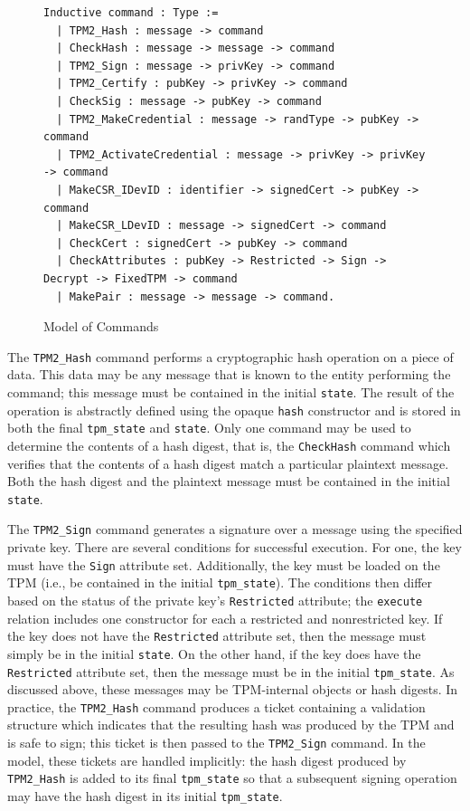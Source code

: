 \documentclass[runningheads]{llncs}
\begin{document}
\begin{figure}[h]
  \begin{lstlisting}[language=Coq]
  Inductive command : Type :=
  | TPM2_Hash : message -> command
  | CheckHash : message -> message -> command
  | TPM2_Sign : message -> privKey -> command
  | TPM2_Certify : pubKey -> privKey -> command
  | CheckSig : message -> pubKey -> command
  | TPM2_MakeCredential : message -> randType -> pubKey -> command
  | TPM2_ActivateCredential : message -> privKey -> privKey -> command
  | MakeCSR_IDevID : identifier -> signedCert -> pubKey -> command
  | MakeCSR_LDevID : message -> signedCert -> command
  | CheckCert : signedCert -> pubKey -> command
  | CheckAttributes : pubKey -> Restricted -> Sign -> Decrypt -> FixedTPM -> command
  | MakePair : message -> message -> command.
  \end{lstlisting}
  \caption{Model of Commands}
  \end{figure}

The \verb|TPM2_Hash| command performs a cryptographic hash operation on a piece of data. This data may be any message that is known to the entity performing the command; this message must be contained in the initial \verb|state|. The result of the operation is abstractly defined using the opaque \verb|hash| constructor and is stored in both the final \verb|tpm_state| and \verb|state|. Only one command may be used to determine the contents of a hash digest, that is, the \verb|CheckHash| command which verifies that the contents of a hash digest match a particular plaintext message. Both the hash digest and the plaintext message must be contained in the initial \verb|state|.

The \verb|TPM2_Sign| command generates a signature over a message using the specified private key. There are several conditions for successful execution. For one, the key must have the \verb|Sign| attribute set. Additionally, the key must be loaded on the TPM (i.e., be contained in the initial \verb|tpm_state|). The conditions then differ based on the status of the private key's \verb|Restricted| attribute; the \verb|execute| relation includes one constructor for each a restricted and nonrestricted key. If the key does not have the \verb|Restricted| attribute set, then the message must simply be in the initial \verb|state|. On the other hand, if the key does have the \verb|Restricted| attribute set, then the message must be in the initial \verb|tpm_state|. As discussed above, these messages may be TPM-internal objects or hash digests. In practice, the \verb|TPM2_Hash| command produces a ticket containing a validation structure which indicates that the resulting hash was produced by the TPM and is safe to sign; this ticket is then passed to the \verb|TPM2_Sign| command. In the model, these tickets are handled implicitly: the hash digest produced by \verb|TPM2_Hash| is added to its final \verb|tpm_state| so that a subsequent signing operation may have the hash digest in its initial \verb|tpm_state|. 
\end{document}
